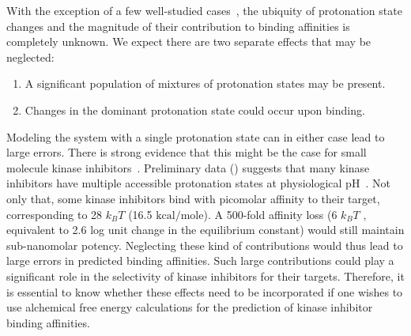 \documentclass[10pt,final]{article}
\newcommand{\pH}{p$\mathrm{H}$\ }
\begin{document}
With the exception of a few well-studied cases~\autocite{Dullweber2001a,Aleksandrov2007a,Czodrowski2007a,Steuber2007a,Czodrowski2007b}, 
the ubiquity of protonation state changes and the magnitude of their contribution to binding affinities is completely unknown. 
%
We expect there are two separate effects that may be neglected:
\begin{enumerate}
 \item A significant population of mixtures of protonation states may be present.
 \item Changes in the dominant protonation state could occur upon binding.
\end{enumerate}
%
Modeling the system with a single protonation state can in either case lead to large errors.
%
There is strong evidence that this might be the case for small molecule kinase inhibitors~\autocite{Szakacs2005a,Seeliger2007a,Lin2013a}. 
%
Preliminary data () suggests that many kinase inhibitors have multiple accessible protonation states at physiological \pH.
%
Not only that, some kinase inhibitors bind with picomolar affinity to their target, corresponding to 28 $k_BT$ (16.5 $\mathrm{kcal/mole}$).
%
A 500-fold affinity loss (6 $k_BT$ , equivalent to 2.6 log unit change in the equilibrium constant) would still maintain sub-nanomolar potency.
%
Neglecting these kind of contributions would thus lead to large errors in predicted binding affinities.
%
Such large contributions could play a significant role in the selectivity of kinase inhibitors for their targets.
%
Therefore, it is essential to know whether these effects need to be incorporated if one wishes to use alchemical free energy calculations for the prediction of kinase inhibitor binding affinities.
\end{document}
